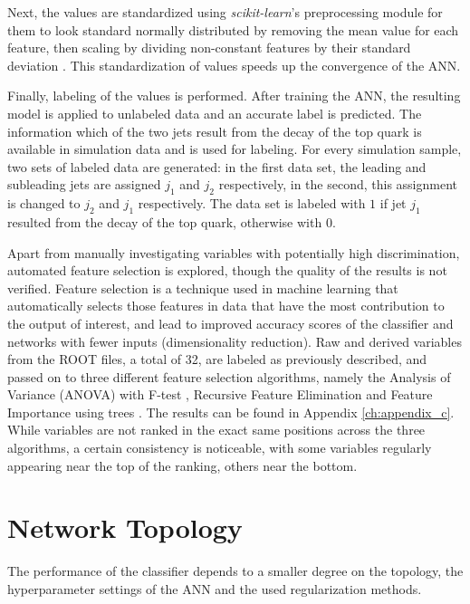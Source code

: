 Next, the values are standardized using \emph{scikit-learn}'s preprocessing module for them to look standard normally distributed by removing the mean value for each feature, then scaling by dividing non-constant features by their standard deviation \cite{scikit-learn}. This standardization of values speeds up the convergence of the ANN.

Finally, labeling of the values is performed. After training the ANN, the resulting model is applied to unlabeled data and an accurate label is predicted. The information which of the two jets result from the decay of the top quark is available in simulation data and is used for labeling. For every simulation sample, two sets of labeled data are generated: in the first data set, the leading and subleading jets are assigned $j_1$ and $j_2$ respectively, in the second, this assignment is changed to $j_2$ and $j_1$ respectively. The data set is labeled with $1$ if jet $j_1$ resulted from the decay of the top quark, otherwise with $0$.

Apart from manually investigating variables with potentially high discrimination, automated feature selection is explored, though the quality of the results is not verified. Feature selection is a technique used in machine learning that automatically selects those features in data that have the most contribution to the output of interest, and lead to improved accuracy scores of the classifier and networks with fewer inputs (dimensionality reduction). Raw and derived variables from the ROOT files, a total of 32, are labeled as previously described, and passed on to three different feature selection algorithms, namely the Analysis of Variance (ANOVA) with F-test \cite{misc:anova}, Recursive Feature Elimination \cite{scikit-learn} and Feature Importance using trees \cite{scikit-learn}. The results can be found in Appendix \ref{ch:appendix_c}. While variables are not ranked in the exact same positions across the three algorithms, a certain consistency is noticeable, with some variables regularly appearing near the top of the ranking, others near the bottom.

\section{Network Topology}
\label{sec:ch-4-network}

The performance of the classifier depends to a smaller degree on the topology, the hyperparameter settings of the ANN and the used regularization methods.


